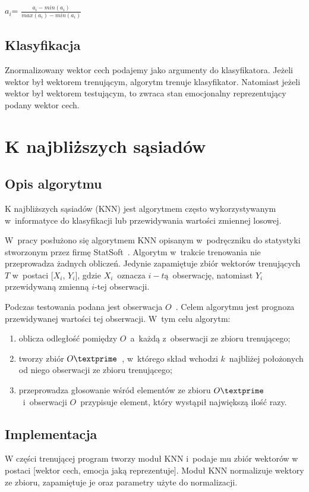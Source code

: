 \documentclass[declaration,shortabstract]{iithesis}
\begin{document}
$a_i$\textprime = $\frac{a_i - min(a_i)}{max(a_i) - min(a_i)}$

\section{Klasyfikacja}
Znormalizowany wektor cech podajemy jako argumenty do klasyfikatora. Jeżeli wektor był wektorem trenującym, algorytm trenuje klasyfikator. Natomiast jeżeli wektor był wektorem testującym, to zwraca stan emocjonalny reprezentujący podany wektor cech.

\chapter{K najbliższych sąsiadów}
\section{Opis algorytmu}
K najbliższych sąsiadów (KNN) jest algorytmem często wykorzystywanym w~informatyce do klasyfikacji lub przewidywania wartości zmiennej losowej.  

W~pracy posłużono się algorytmem KNN opisanym w~podręczniku do statystyki stworzonym przez firmę StatSoft~\cite{KNN_Wstep}.
Algorytm w~trakcie trenowania nie przeprowadza żadnych obliczeń. Jedynie zapamiętuje zbiór wektorów trenujących $T$ w~postaci [$X_i$, $Y_i$], gdzie $X_i$~oznacza $i-tą$~obserwację, natomiast $Y_i$ przewidywaną zmienną $i$-tej obserwacji.

Podczas testowania podana jest obserwacja $O$~. Celem algorytmu jest prognoza przewidywanej wartości tej obserwacji. W~tym celu algorytm:
\begin{enumerate}
\item oblicza odległość pomiędzy $O$~a~każdą z~obserwacji ze zbioru trenującego;
\item tworzy zbiór $O\textprime$~, w~którego skład wchodzi $k$~najbliżej położonych od niego obserwacji ze zbioru trenującego;
\item przeprowadza głosowanie wśród elementów ze zbioru $O\textprime$~i~obserwacji $O$~przypisuje element, który wystąpił największą ilość razy.
\end{enumerate}

\section{Implementacja}
W części trenującej program tworzy moduł KNN i~podaje mu zbiór wektorów w postaci [wektor cech, emocja jaką reprezentuje]. Moduł KNN normalizuje wektory ze zbioru, zapamiętuje je oraz parametry użyte do normalizacji.
\end{document}
